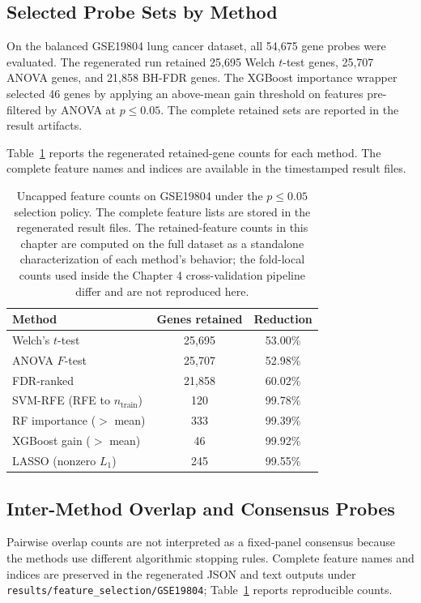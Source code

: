 \subsection{Selected Probe Sets by Method}

On the balanced GSE19804 lung cancer dataset, all 54,675 gene probes were evaluated. The regenerated run retained 25,695 Welch $t$-test genes, 25,707 ANOVA genes, and 21,858 BH-FDR genes. The XGBoost importance wrapper selected 46 genes by applying an above-mean gain threshold on features pre-filtered by ANOVA at $p \leq 0.05$. The complete retained sets are reported in the result artifacts.

Table~\ref{tab:gse19804_probes} reports the regenerated retained-gene counts for each method. The complete feature names and indices are available in the timestamped result files.

\begin{table}[H]
\centering
\caption{Uncapped feature counts on GSE19804 under the $p \leq 0.05$ selection policy. The complete feature lists are stored in the regenerated result files. The retained-feature counts in this chapter are computed on the full dataset as a standalone characterization of each method's behavior; the fold-local counts used inside the Chapter 4 cross-validation pipeline differ and are not reproduced here.}
\label{tab:gse19804_probes}
\small
\begin{tabular}{lcc}
\toprule
\textbf{Method} & \textbf{Genes retained} & \textbf{Reduction} \\
\midrule
Welch's $t$-test & 25,695 & 53.00\% \\
ANOVA $F$-test & 25,707 & 52.98\% \\
FDR-ranked & 21,858 & 60.02\% \\
SVM-RFE (RFE to $n_{\mathrm{train}}$) & 120 & 99.78\% \\
RF importance ($>$ mean) & 333 & 99.39\% \\
XGBoost gain ($>$ mean) & 46 & 99.92\% \\
LASSO (nonzero $L_1$) & 245 & 99.55\% \\
\bottomrule
\end{tabular}
\end{table}

\subsection{Inter-Method Overlap and Consensus Probes}

Pairwise overlap counts are not interpreted as a fixed-panel consensus because the methods use different algorithmic stopping rules. Complete feature names and indices are preserved in the regenerated JSON and text outputs under \texttt{results/feature\_selection/GSE19804}; Table~\ref{tab:gse19804_probes} reports reproducible counts.

